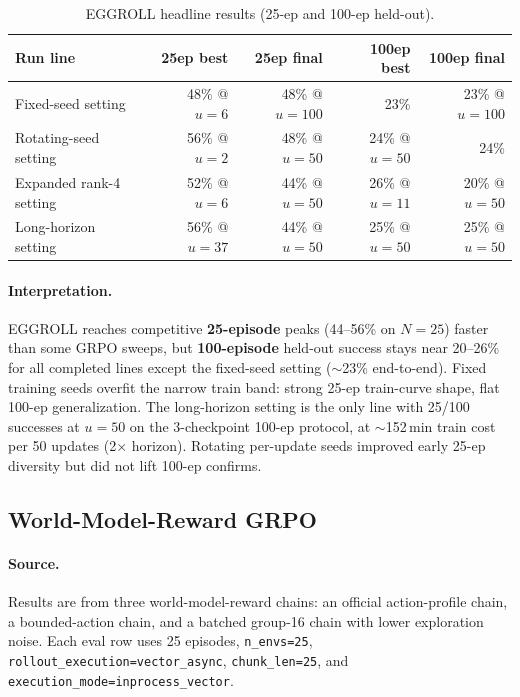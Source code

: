 \begin{table}[H]
\centering
\caption{EGGROLL headline results (25-ep and 100-ep held-out).}
\label{tab:eggroll-headline}
\small
\setlength{\tabcolsep}{3pt}
\begin{tabular}{@{}lrrrr@{}}
\toprule
Run line & 25ep best & 25ep final & 100ep best & 100ep final \\
\midrule
Fixed-seed setting & 48\% @ $u{=}6$ & 48\% @ $u{=}100$ & 23\% & 23\% @ $u{=}100$ \\
Rotating-seed setting & 56\% @ $u{=}2$ & 48\% @ $u{=}50$ & 24\% @ $u{=}50$ & 24\% \\
Expanded rank-4 setting & 52\% @ $u{=}6$ & 44\% @ $u{=}50$ & 26\% @ $u{=}11$ & 20\% @ $u{=}50$ \\
Long-horizon setting & 56\% @ $u{=}37$ & 44\% @ $u{=}50$ & 25\% @ $u{=}50$ & 25\% @ $u{=}50$ \\
\bottomrule
\end{tabular}
\end{table}

\paragraph{Interpretation.}
EGGROLL reaches competitive \textbf{25-episode} peaks (44--56\% on $N{=}25$) faster than some GRPO sweeps, but \textbf{100-episode} held-out success stays near 20--26\% for all completed lines except the fixed-seed setting ($\sim$23\% end-to-end). Fixed training seeds overfit the narrow train band: strong 25-ep train-curve shape, flat 100-ep generalization. The long-horizon setting is the only line with 25/100 successes at $u{=}50$ on the 3-checkpoint 100-ep protocol, at $\sim$152\,min train cost per 50 updates (2$\times$ horizon). Rotating per-update seeds improved early 25-ep diversity but did not lift 100-ep confirms.

\FloatBarrier
\subsection{World-Model-Reward GRPO}
\label{sec:wm-reward-grpo}

\paragraph{Source.}
Results are from three world-model-reward chains: an official action-profile chain, a bounded-action chain, and a batched group-16 chain with lower exploration noise.
Each eval row uses 25 episodes, \texttt{n\_envs=25}, \texttt{rollout\_execution=vector\_async}, \texttt{chunk\_len=25}, and \texttt{execution\_mode=inprocess\_vector}.

